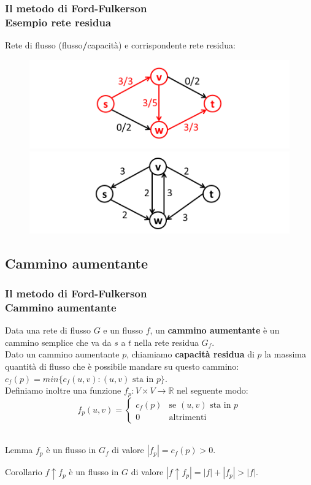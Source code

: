 \documentclass{beamer}
\begin{document}
\begin{frame}
\frametitle{Il metodo di Ford-Fulkerson\\Esempio rete residua}
Rete di flusso (flusso\textbf{/}capacità) e corrispondente rete residua:
\begin{figure}
\includegraphics[width=0.8\linewidth]{1.png}\\
\includegraphics[width=0.8\linewidth]{2.png}
\end{figure}
\end{frame}

\subsection{Cammino aumentante}

\begin{frame}
\frametitle{Il metodo di Ford-Fulkerson\\Cammino aumentante}
Data una rete di flusso $G$ e un flusso $f$, un \textbf{cammino aumentante} è un cammino semplice che va da $s$ a $t$ nella rete residua $G_f$.\\
Dato un cammino aumentante $p$, chiamiamo \textbf{capacità residua} di $p$ la massima quantità di flusso che è possibile mandare su questo cammino:\\
$c_f(p)=min\{c_f(u,v):(u,v) \mbox{ sta in } p\}$.\\
Definiamo inoltre una funzione $f_p:V\times V\rightarrow \mathbb{R}$ nel seguente modo:\\
$$f_p(u,v) =
\left\{
	\begin{array}{ll}
		c_f(p) & \mbox{se } (u,v) \mbox{ sta in } p\\
		0 & \mbox{altrimenti}
	\end{array}
\right.$$\\
\begin{block}{Lemma}
$f_p$ è un flusso in $G_f$ di valore $|f_p|=c_f(p)>0$.
\end{block}
\begin{block}{Corollario}
$f\uparrow f_p$ è un flusso in $G$ di valore $|f\uparrow f_p|=|f|+|f_p|>|f|.$
\end{block}
\end{frame}
\end{document}
